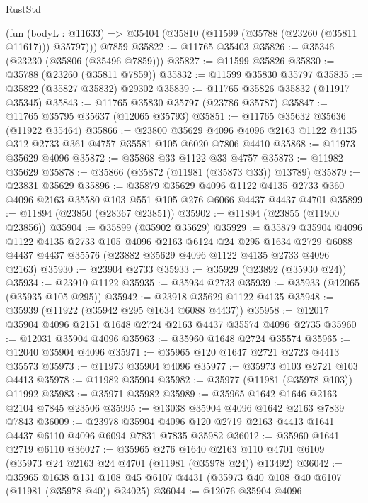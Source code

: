 \begin{lexlean}{RustStd}
\begin{coremodule}
    (fun (bodyL : @11633) => @35404 (@35810 (@11599 (@35788 (@23260 (@35811 @11617))) @35797)))
    @7859
@35822 := @11765 @35403
@35826 := @35346 (@23230 (@35806 (@35496 @7859)))
@35827 := @11599 @35826
@35830 := @35788 (@23260 (@35811 @7859))
@35832 := @11599 @35830 @35797
@35835 := @35822 (@35827 @35832) @29302
@35839 := @11765 @35826 @35832 (@11917 @35345)
@35843 := @11765 @35830 @35797 (@23786 @35787)
@35847 := @11765 @35795 @35637 (@12065 @35793)
@35851 := @11765 @35632 @35636 (@11922 @35464)
@35866 := @23800
    @35629
    @4096
    @4096
    @2163
    @1122
    @4135
    @312
    @2733
    @361
    @4757
    @35581
    @105
    @6020
    @7806
    @4410
@35868 := @11973 @35629 @4096
@35872 := @35868 @33 @1122 @33 @4757
@35873 := @11982 @35629
@35878 := @35866 (@35872 (@11981 (@35873 @33)) @13789)
@35879 := @23831 @35629
@35896 := @35879
    @35629
    @4096
    @1122
    @4135
    @2733
    @360
    @4096
    @2163
    @35580
    @103
    @551
    @105
    @276
    @6066
    @4437
    @4437
    @4701
@35899 := @11894 (@23850 (@28367 @23851))
@35902 := @11894 (@23855 (@11900 @23856))
@35904 := @35899 (@35902 @35629)
@35929 := @35879
    @35904
    @4096
    @1122
    @4135
    @2733
    @105
    @4096
    @2163
    @6124
    @24
    @295
    @1634
    @2729
    @6088
    @4437
    @4437
    @35576
    (@23882 @35629 @4096 @1122 @4135 @2733 @4096 @2163)
@35930 := @23904 @2733
@35933 := @35929 (@23892 (@35930 @24))
@35934 := @23910 @1122
@35935 := @35934 @2733
@35939 := @35933 (@12065 (@35935 @105 @295))
@35942 := @23918 @35629 @1122 @4135
@35948 := @35939 (@11922 (@35942 @295 @1634 @6088 @4437))
@35958 := @12017 @35904 @4096 @2151 @1648 @2724 @2163 @4437 @35574 @4096 @2735
@35960 := @12031 @35904 @4096
@35963 := @35960 @1648 @2724 @35574
@35965 := @12040 @35904 @4096
@35971 := @35965 @120 @1647 @2721 @2723 @4413 @35573
@35973 := @11973 @35904 @4096
@35977 := @35973 @103 @2721 @103 @4413
@35978 := @11982 @35904
@35982 := @35977 (@11981 (@35978 @103)) @11992
@35983 := @35971 @35982
@35989 := @35965 @1642 @1646 @2163 @2104 @7845 @23506
@35995 := @13038 @35904 @4096 @1642 @2163 @7839 @7843
@36009 := @23978
    @35904
    @4096
    @120
    @2719
    @2163
    @4413
    @1641
    @4437
    @6110
    @4096
    @6094
    @7831
    @7835
    @35982
@36012 := @35960 @1641 @2719 @6110
@36027 := @35965
    @276
    @1640
    @2163
    @110
    @4701
    @6109
    (@35973 @24 @2163 @24 @4701 (@11981 (@35978 @24)) @13492)
@36042 := @35965
    @1638
    @131
    @108
    @45
    @6107
    @4431
    (@35973 @40 @108 @40 @6107 (@11981 (@35978 @40)) @24025)
@36044 := @12076 @35904 @4096

\end{coremodule}
\end{lexlean}
